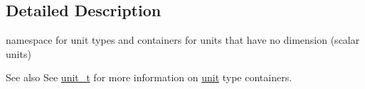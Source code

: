 \subsection{Detailed Description}
namespace for unit types and containers for units that have no dimension (scalar units) 

\begin{DoxySeeAlso}{See also}
See \hyperlink{classunits_1_1unit__t}{unit\+\_\+t} for more information on \hyperlink{structunits_1_1unit}{unit} type containers. 
\end{DoxySeeAlso}
